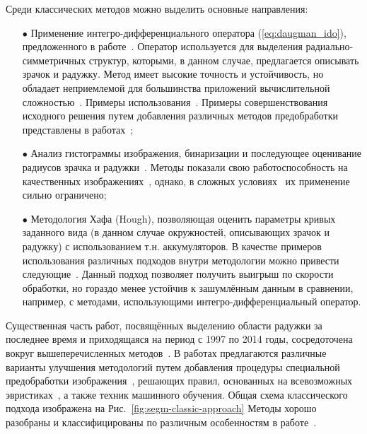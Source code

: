 Среди классических методов можно выделить основные направления:
\begin{enumerate}
	\item[$\bullet$] Применение интегро-дифференциального оператора (\ref{eq:daugman_ido}), предложенного в работе~\cite{daugman_how_works}. Оператор используется для выделения радиально-симметричных структур, которыми, в данном случае, предлагается описывать зрачок и радужку. Метод имеет высокие точность и устойчивость, но обладает неприемлемой для большинства приложений вычислительной сложностью~\cite{matveev_doctor_thesis}. Примеры использования~\cite{bakhtiari_2006,adam_2008,barzegar_2008}. Примеры совершенствования исходного решения путем добавления различных методов предобработки представлены в работах~\cite{alonso_11,alonso_12,hu_11,jeong_10,mahadeo_12};
	\item[$\bullet$] Анализ гистограммы изображения, бинаризации и последующее оценивание радиусов зрачка и радужки~\cite{guang_2007,pan_2007,ling_2010}. Методы показали свою работоспособность на качественных изображениях~\cite{casia_v3,bath_2005}, однако, в сложных условиях~\cite{ndiris_2010,ubiris_2005} их применение сильно ограничено;
	\item[$\bullet$] Методология Хафа (Hough), позволяющая оценить параметры кривых заданного вида (в данном случае окружностей, описывающих зрачок и радужку) с использованием т.н. аккумуляторов. В качестве примеров использования различных подходов внутри методологии можно привести следующие~\cite{wildes_1997,proenca_2006,basit_2007,boyd_2010}. Данный подход позволяет получить выигрыш по скорости обработки, но гораздо менее устойчив к зашумлённым данным в сравнении, например, с методами, использующими интегро-дифференциальный оператор.
\end{enumerate}

Существенная часть работ, посвящённых выделению области радужки за последнее время и приходящаяся на период с 1997 по 2014 годы, сосредоточена вокруг вышеперечисленных методов~\cite{korobkin_odinokikh_segm_2018}. В работах предлагаются различные варианты улучшения методологий путем добавления процедуры специальной предобработки изображения~\cite{yuan_2005,pan_2007}, решающих правил, основанных на всевозможных эвристиках~\cite{matveev_doctor_thesis,daugman_how_works,ma_2004,zhou_2004,bowyer_survey_2008,moravcik_2010}, а также техник машинного обучения. Общая схема классического подхода изображена на Рис.~\ref{fig:segm-classic-approach} Методы хорошо разобраны и классифицированы по различным особенностям в работе~\cite{matveev_doctor_thesis}.

